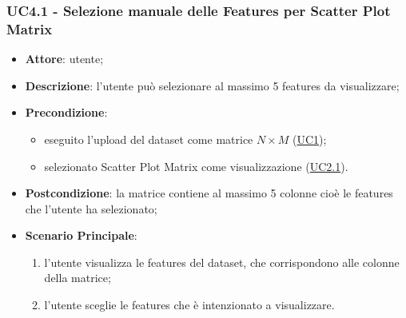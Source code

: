     \subsubsection{UC4.1 - Selezione manuale delle Features per Scatter Plot Matrix}
    \label{uc4.1}
    \begin{itemize}
    \item \textbf{Attore}: utente;
    \item \textbf{Descrizione}: l'utente può selezionare al massimo 5 features da visualizzare;
    \item \textbf{Precondizione}: 
     \begin{itemize}
        \item eseguito l'upload del dataset come matrice $N\times M$ (\hyperref[uc1]{UC1});
        \item selezionato Scatter Plot Matrix come visualizzazione (\hyperref[uc2.1]{UC2.1}).
    \end{itemize}
    \item \textbf{Postcondizione}: la matrice contiene al massimo 5 colonne cioè le features che l'utente ha selezionato;
    \item \textbf{Scenario Principale}: 
    \begin{enumerate}
        \item l'utente visualizza le features del dataset, che corrispondono alle colonne della matrice;
        \item l'utente sceglie le features che è intenzionato a visualizzare.
    \end{enumerate}  
    \end{itemize}